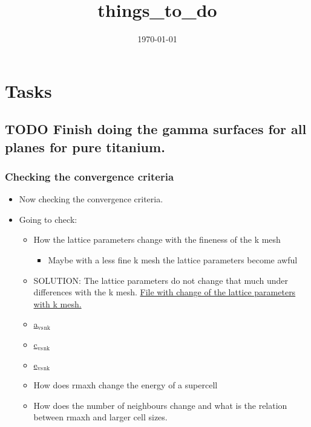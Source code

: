 \documentclass[11pt]{article}
\date{\today}
\title{things\_to\_do}
\begin{document}
\maketitle
\tableofcontents




\section{Tasks}
\label{sec-1}
\subsection{{\bfseries\sffamily TODO} Finish doing the gamma surfaces for all planes for pure titanium.}
\label{sec-1-1}
\subsubsection{Checking the convergence criteria}
\label{sec-1-1-1}
\begin{itemize}
\item Now checking the convergence criteria.
\item Going to check:
\begin{itemize}
\item How the lattice parameters change with the fineness of the k mesh
\begin{itemize}
\item Maybe with a less fine k mesh the lattice parameters become awful
\end{itemize}
\item SOLUTION: The lattice parameters do not change that much under
differences with the k mesh. \href{file:///home/tigany/Documents/disl_gsurf/hcp_pris_screw/hcp_relaxed_pris_screw/gamma_surfaces/get_hom_shear_bc_gs.py}{File with change of the lattice
parameters with k mesh. }
\item \href{file:///home/tigany/Documents/disl_gsurf/hcp_pris_screw/hcp_relaxed_pris_screw/gamma_surfaces/a_hcp_vs_nk.png}{a$_{\text{vs}}$$_{\text{nk}}$}
\item \href{file:///home/tigany/Documents/disl_gsurf/hcp_pris_screw/hcp_relaxed_pris_screw/gamma_surfaces/c_hcp_vs_nk.png}{c$_{\text{vs}}$$_{\text{nk}}$}
\item \href{file:///home/tigany/Documents/disl_gsurf/hcp_pris_screw/hcp_relaxed_pris_screw/gamma_surfaces/e_hcp_vs_nk.png}{e$_{\text{vs}}$$_{\text{nk}}$}
\item How does rmaxh change the energy of a supercell
\item How does the number of neighbours change and what is the relation
between rmaxh and larger cell sizes.
\end{itemize}
\end{itemize}
\end{document}
